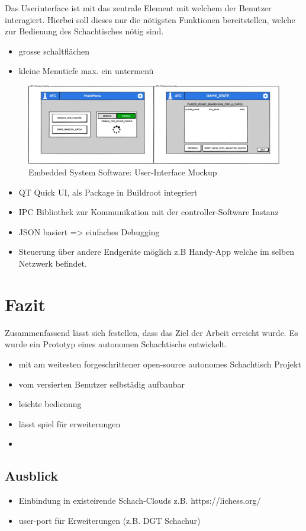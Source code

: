 Das Userinterface ist mit das zentrale Element mit welchem der Benutzer
interagiert. Hierbei soll dieses nur die nötigsten Funktionen
bereitstellen, welche zur Bedienung des Schachtisches nötig sind.

\begin{itemize}
\tightlist
\item
  grosse schaltflächen
\item
  kleine Menutiefe max. ein untermenü
\end{itemize}

\begin{figure}
\centering
\includegraphics{images/ATC_Gui.png}
\caption{Embedded System Software: User-Interface Mockup
\label{ATC_Gui}}
\end{figure}

\begin{itemize}
\tightlist
\item
  QT Quick UI, als Package in Buildroot integriert
\item
  IPC Bibliothek zur Kommunikation mit der controller-Software Instanz
\item
  JSON basiert =\textgreater{} einfaches Debugging
\item
  Steuerung über andere Endgeräte möglich z.B Handy-App welche im selben
  Netzwerk befindet.
\end{itemize}

\hypertarget{fazit}{%
\section{Fazit}\label{fazit}}

Zusammenfassend lässt sich festellen, dass das Ziel der Arbeit erreicht
wurde. Es wurde ein Prototyp eines autonomen Schachtischs entwickelt.

\begin{itemize}
\item
  mit am weitesten forgeschrittener open-source autonomes Schachtisch
  Projekt
\item
  vom versierten Benutzer selbstädig aufbaubar
\item
  leichte bedienung
\item
  lässt spiel für erweiterungen
\item
\end{itemize}

\hypertarget{ausblick}{%
\subsection{Ausblick}\label{ausblick}}

\begin{itemize}
\tightlist
\item
  Einbindung in existeirende Schach-Clouds z.B. https://lichess.org/
\item
  user-port für Erweiterungen (z.B. DGT Schachur)
\end{itemize}
